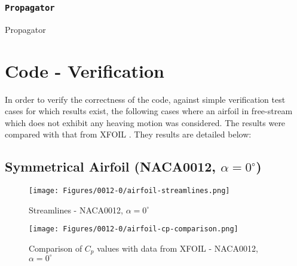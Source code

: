 \subsubsection{\texttt{Propagator}}
\begin{algorithm}[H]
    \caption{Propagator}
\end{algorithm}


\section{Code - Verification}
In order to verify the correctness of the code, against simple verification test cases for which results exist, the following cases where an airfoil in free-stream which does not exhibit any heaving motion was considered. The results were compared with that from XFOIL \parencite{drela1989xfoil}. They results are detailed below:
\subsection{Symmetrical Airfoil (NACA0012, $\alpha=0^{\circ}$)}
\begin{figure}[H]
	\centering
	\texttt{[image: Figures/0012-0/airfoil-streamlines.png]}
	\caption{Streamlines - NACA0012, $\alpha=0^{\circ}$}
	\label{fig:0012-0-airfoil\_streamlines}
\end{figure}
\begin{figure}[H]
	\centering
	\texttt{[image: Figures/0012-0/airfoil-cp-comparison.png]}
	\caption{Comparison of $C_p$ values with data from XFOIL  - NACA0012, $\alpha=0^{\circ}$}
	\label{fig:0012-0-airfoil\_cp\_comparison}
\end{figure}

